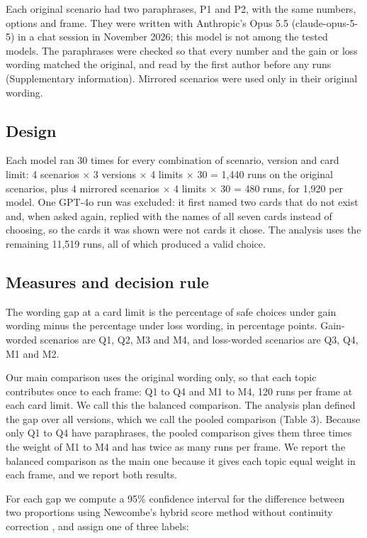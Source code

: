 \documentclass[11pt]{article}
\begin{document}
Each original scenario had two paraphrases, P1 and P2, with the same numbers, options and frame. They were written with Anthropic's Opus 5.5 (claude-opus-5-5) in a chat session in November 2026; this model is not among the tested models. The paraphrases were checked so that every number and the gain or loss wording matched the original, and read by the first author before any runs (Supplementary information). Mirrored scenarios were used only in their original wording.

\subsection{Design}

Each model ran 30 times for every combination of scenario, version and card limit: 4 scenarios $\times$ 3 versions $\times$ 4 limits $\times$ 30 = 1,440 runs on the original scenarios, plus 4 mirrored scenarios $\times$ 4 limits $\times$ 30 = 480 runs, for 1,920 per model. One GPT-4o run was excluded: it first named two cards that do not exist and, when asked again, replied with the names of all seven cards instead of choosing, so the cards it was shown were not cards it chose. The analysis uses the remaining 11,519 runs, all of which produced a valid choice.

\subsection{Measures and decision rule}

The wording gap at a card limit is the percentage of safe choices under gain wording minus the percentage under loss wording, in percentage points. Gain-worded scenarios are Q1, Q2, M3 and M4, and loss-worded scenarios are Q3, Q4, M1 and M2.

Our main comparison uses the original wording only, so that each topic contributes once to each frame: Q1 to Q4 and M1 to M4, 120 runs per frame at each card limit. We call this the balanced comparison. The analysis plan defined the gap over all versions, which we call the pooled comparison (Table 3). Because only Q1 to Q4 have paraphrases, the pooled comparison gives them three times the weight of M1 to M4 and has twice as many runs per frame. We report the balanced comparison as the main one because it gives each topic equal weight in each frame, and we report both results.

For each gap we compute a 95\% confidence interval for the difference between two proportions using Newcombe's hybrid score method without continuity correction \citep{newcombe1998interval}, and assign one of three labels:
\end{document}
